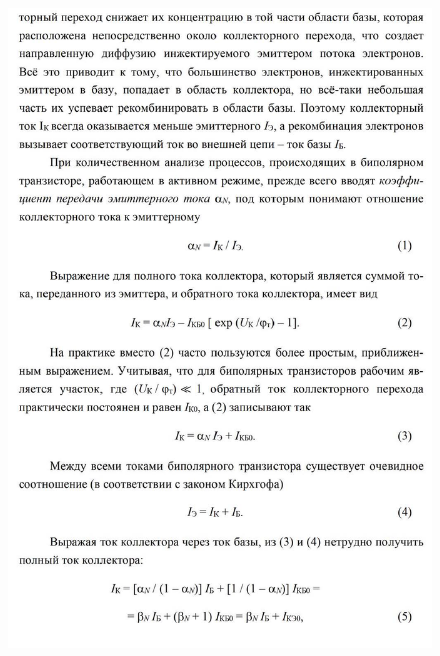 \documentclass[a4paper,14pt]{article}
\begin{document}
\begin{figure}[H]
	\centering
	\includegraphics[width=\linewidth]{images/theory_3}
	\caption*{}
	\label{fig:theory3}
\end{figure}
\end{document}
